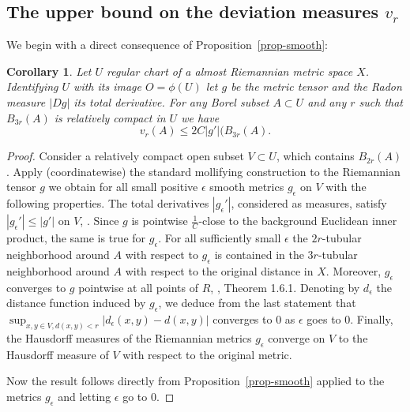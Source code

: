 \documentclass[12pt,leqno,intlimits]{amsart}
\numberwithin{equation}{section}
\newtheorem{cor}[thm]{Corollary}
\theoremstyle{definition}
\theoremstyle{remark}
\newcommand{\pref}[1]{Proposition~\ref{#1}}
\begin{document}










\subsection{The upper bound on the deviation  measures $v_r$}
We begin with a direct consequence of \pref{prop-smooth}:
\begin{cor} \label{cor-dc-vr}
Let $U$ regular chart of a almost Riemannian metric space $X$. Identifying $U$ with its image $O=\phi (U)$ let
$g$ be the metric tensor and the Radon measure $|Dg|$ its total derivative.  For any Borel subset $A\subset U$ and any $r$
such that $B_{3r} (A)$ is relatively compact in $U$ we have $$v_r (A) \leq 2 C |g'| (B_{3r} (A) .$$
\end{cor}

\begin{proof}
Consider a relatively compact open subset $ V \subset U$, which contains $B_{2r} (A)$.  Apply (coordinatewise) the standard mollifying construction
to the Riemannian tensor $g$ we obtain for all small positive $\epsilon$  smooth metrics $g_{\epsilon}$ on $V$ with the following properties.
The total derivatives $|g_{\epsilon} '|$, considered as measures, satisfy  $|g_{\epsilon} '|\leq |g'|$ on $V$, \cite[Theorem 5.3.1]{Ziemer}.   Since $g$ is pointwise   $\frac 1 C$-close to the background Euclidean inner product, the same is true for  $g_{\epsilon}$.  For all sufficiently small $\epsilon$ the $2r$-tubular neighborhood around $A$ with respect to $g_{\epsilon}$ is contained in the $3r$-tubular neighborhood around $A$ with respect to the original distance in $X$. Moreover, $g_{\epsilon}$ converges to $g$ pointwise at all points of $R$, \cite{Ziemer}, Theorem 1.6.1.
Denoting by $d_{\epsilon}$ the distance function induced by $g_{\epsilon}$, we deduce from the last statement that $\sup _{x,y \in V, d(x,y) <r} |d_{\epsilon} (x,y) -d(x,y)|$ converges to $0$ as $\epsilon$ goes to $0$. Finally, the Hausdorff measures of the Riemannian metrics $g_{\epsilon}$ converge on $V$ to the Hausdorff measure of $V$ with respect to the original metric.

 Now the result follows directly  from \pref{prop-smooth} applied to the metrics $g_{\epsilon}$ and letting $\epsilon$ go to $0$.
\end{proof}
\end{document}
